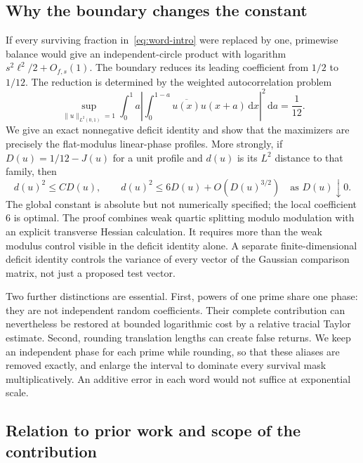 \documentclass[11pt,reqno]{amsart}
\numberwithin{equation}{section}
\newcommand{\dd}{\,\mathrm d}
\newcommand{\norm}[1]{\lVert#1\rVert}
\begin{document}
\subsection*{Why the boundary changes the constant}

If every surviving fraction in~\eqref{eq:word-intro} were replaced by
one, primewise balance would give an independent-circle product with
logarithm $s^2\ell^2/2+O_{f,s}(1)$. The boundary reduces its leading
coefficient from $1/2$ to $1/12$. The reduction is determined by the
weighted autocorrelation problem
\begin{equation}\label{eq:variational-intro}
 \sup_{\norm u_{L^2(0,1)}=1}
 \int_0^1 a\left|\int_0^{1-a}\overline{u(x)}u(x+a)\dd x\right|^2
 \dd a=\frac1{12}.
\end{equation}
We give an exact nonnegative deficit identity and show that the
maximizers are precisely the flat-modulus linear-phase profiles.
More strongly, if $D(u)=1/12-J(u)$ for a unit profile and $d(u)$
is its $L^2$ distance to that family, then
\begin{equation}\label{eq:stability-intro}
 d(u)^2\le C D(u),\qquad
 d(u)^2\le6D(u)+O(D(u)^{3/2})\quad\text{as }D(u)\downarrow0.
\end{equation}
The global constant is absolute but not numerically specified;
the local coefficient $6$ is optimal. The proof combines weak
quartic splitting modulo modulation with an explicit transverse
Hessian calculation. It requires more than the weak modulus
control visible in the deficit identity alone.
A separate finite-dimensional deficit identity controls the
variance of every vector of the Gaussian comparison matrix,
not just a proposed test vector.

Two further distinctions are essential. First, powers of one prime
share one phase: they are not independent random coefficients.
Their complete contribution can nevertheless be restored at bounded
logarithmic cost by a relative tracial Taylor estimate. Second,
rounding translation lengths can create false returns. We keep an
independent phase for each prime while rounding, so that these aliases
are removed exactly, and enlarge the interval to dominate every
survival mask multiplicatively. An additive error in each word would
not suffice at exponential scale.

\subsection*{Relation to prior work and scope of the contribution}
\end{document}

